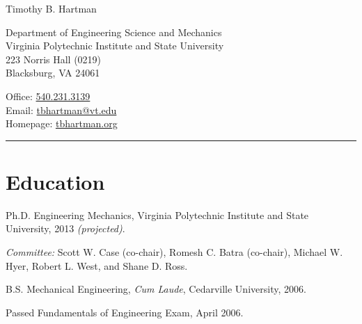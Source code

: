 \documentclass[10pt,letterpaper]{article}
\newcommand\name{Timothy B. Hartman}
\renewenvironment{itemize}{
  \begin{list}{}{
    \setlength{\leftmargin}{1.5em}
    \setlength{\itemsep}{0.25em}
    \setlength{\parskip}{0pt}
    \setlength{\parsep}{0.25em}
  }
}{
  \end{list}
}
\begin{document}
{\huge \name}


\bigskip

\begin{minipage}[t]{0.5\textwidth}
  Department of Engineering Science and Mechanics \\
  Virginia Polytechnic Institute and State University \\
  223 Norris Hall (0219) \\
  Blacksburg, VA 24061
\end{minipage}
\begin{minipage}[t]{0.5\textwidth}
  Office: \href{tel:5402313139}{540.231.3139} \\
\newcommand{\email}{tbhartman@vt.edu}
  Email: \href{mailto:\email}{\email} \\
  Homepage: \href{http://tbhartman.org}{tbhartman.org}
\end{minipage}

\vspace{12pt}

\rule{\textwidth}{1pt}

%
%

\section*{Education}

\begin{itemize}
    \item Ph.D. Engineering Mechanics, Virginia Polytechnic Institute and State University, 2013 \textit{(projected)}.
    \begin{itemize}
        \item \textit{Committee:}
        Scott W. Case (co-chair), Romesh C. Batra (co-chair), Michael W. Hyer, Robert L. West, and Shane D. Ross.
    \end{itemize}
    \item B.S. Mechanical Engineering, \textit{Cum Laude}, Cedarville University, 2006.
    \begin{itemize}
        \item Passed Fundamentals of Engineering Exam, April 2006.
    \end{itemize}
\end{itemize}
\end{document}
